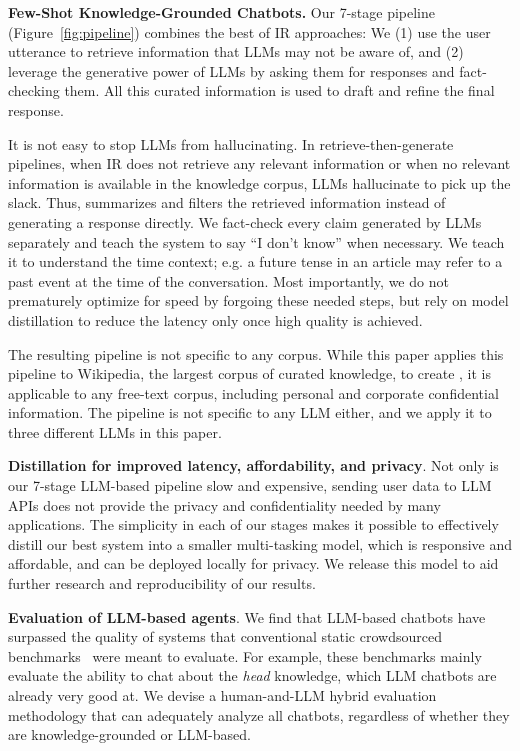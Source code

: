 {\bf Few-Shot Knowledge-Grounded Chatbots.}
Our 7-stage pipeline (Figure~\ref{fig:pipeline}) combines the best of IR approaches: We (1) use the user utterance to retrieve information that LLMs may not be aware of, and (2) leverage the generative power of LLMs by asking them for responses and fact-checking them. All this curated information is used to draft and refine the final response.

It is not easy to stop LLMs from hallucinating.
In retrieve-then-generate pipelines, when IR does not retrieve any relevant information or when no relevant information is available in the knowledge corpus, LLMs hallucinate to pick up the slack. Thus, \system summarizes and filters the retrieved information instead of generating a response directly. We fact-check every claim generated by LLMs separately and teach the system to say ``I don't know'' when necessary. We teach it to understand the time context; e.g. a future tense in an article may refer to a past event at the time of the conversation. Most importantly, we do not prematurely optimize for speed by forgoing these needed steps, but rely on model distillation to reduce the latency only once high quality is achieved.

The resulting pipeline is not specific to any corpus. While this paper applies this pipeline to Wikipedia, the largest corpus of curated knowledge, to create \system, it is applicable to any free-text corpus, including personal and corporate confidential information. The pipeline is not specific to any LLM either, and we apply it to three different LLMs in this paper.

{\bf Distillation for improved latency, affordability, and privacy}. 
Not only is our 7-stage LLM-based pipeline slow and expensive, sending user data to LLM APIs does not provide the privacy and confidentiality needed by many applications. The simplicity in each of our stages makes it possible to effectively distill our best system into a smaller multi-tasking model, which is responsive and affordable, and can be deployed locally for privacy. We release this model to aid further research and reproducibility of our results.

{\bf Evaluation of LLM-based agents}. 
We find that LLM-based chatbots have surpassed the quality of systems that  
conventional static crowdsourced benchmarks~\cite{dinan2019wizard, komeili-etal-2022-internet} were meant to evaluate. For example, these benchmarks mainly evaluate the ability to chat about the \emph{head} knowledge, which LLM chatbots are already very good at. We devise a human-and-LLM hybrid evaluation methodology that can adequately analyze all chatbots, regardless of whether they are knowledge-grounded or LLM-based.

